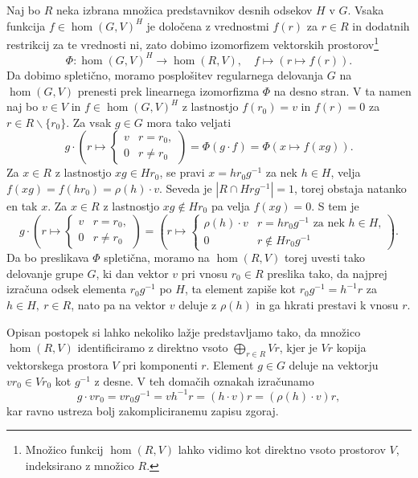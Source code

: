 \documentclass[11pt]{book}
\theoremstyle{definition}
\theoremstyle{zgled}
\theoremstyle{odprtproblem}
\theoremstyle{domacanaloga}
\theoremstyle{izrek}
\begin{document}
Naj bo $R$ neka izbrana množica predstavnikov desnih odsekov $H$ v $G$. Vsaka funkcija $f \in \hom(G,V)^H$ je določena z vrednostmi $f(r)$ za $r \in R$ in dodatnih restrikcij za te vrednosti ni, zato dobimo izomorfizem vektorskih prostorov\footnote{Množico funkcij $\hom(R,V)$ lahko vidimo kot direktno vsoto prostorov $V$, indeksirano z množico $R$.}
    \[
        \Phi \colon \hom(G,V)^H \to \hom(R,V), \quad
        f \mapsto \left( r \mapsto f(r) \right).
    \]
Da dobimo spletično, moramo posplošitev regularnega delovanja $G$ na $\hom(G,V)$ prenesti prek linearnega izomorfizma $\Phi$ na desno stran. V ta namen naj bo $v \in V$ in $f \in \hom(G,V)^H$ z lastnostjo $f(r_0) = v$ in $f(r) = 0$ za $r \in R \backslash \{ r_0 \}$. Za vsak $g \in G$ mora tako veljati
    \[
        g \cdot \left( r \mapsto \begin{cases} v & r = r_0, \\ 0 & r \neq r_0 \end{cases} \right) =
        \Phi \left( g \cdot f \right) =
        \Phi \left( x \mapsto f(xg) \right).
    \]
Za $x \in R$ z lastnostjo $xg \in Hr_0$, se pravi $x = h r_0 g^{-1}$ za nek $h \in H$, velja $f(xg) = f(hr_0) = \rho(h) \cdot v$. Seveda je $|R \cap H r g^{-1}| = 1$, torej obstaja natanko en tak $x$. Za $x \in R$ z lastnostjo $xg \notin Hr_0$ pa velja $f(xg) = 0$. S tem je
    \[
        g \cdot \left( r \mapsto \begin{cases} v & r = r_0, \\ 0 & r \neq r_0 \end{cases} \right) =
        \left( r \mapsto \begin{cases} \rho(h) \cdot v & r = h r_0 g^{-1} \text{ za nek $h \in H$,} \\ 0 & r \notin H r_0 g^{-1} \end{cases} \right).
    \]
Da bo preslikava $\Phi$ spletična, moramo na $\hom(R,V)$ torej uvesti tako delovanje grupe $G$, ki dan vektor $v$ pri vnosu $r_0 \in R$ preslika tako, da najprej izračuna odsek elementa $r_0 g^{-1}$ po $H$, ta element zapiše kot $r_0 g^{-1} = h^{-1} r$ za $h \in H, \ r \in R$, nato pa na vektor $v$ deluje z $\rho(h)$ in ga hkrati prestavi k vnosu $r$.
    
Opisan postopek si lahko nekoliko lažje predstavljamo tako, da množico $\hom(R,V)$ identificiramo z direktno vsoto $\bigoplus_{r \in R} V r$, kjer je $Vr$ kopija vektorskega prostora $V$ pri komponenti $r$. Element $g \in G$ deluje na vektorju $v r_0 \in Vr_0$ kot $g^{-1}$ z desne. V teh domačih oznakah izračunamo
    \[
        g \cdot v r_0 = v r_0 g^{-1} = v h^{-1} r = (h \cdot v) r = (\rho(h) \cdot v) r,
    \]
kar ravno ustreza bolj zakompliciranemu zapisu zgoraj.
\end{document}
